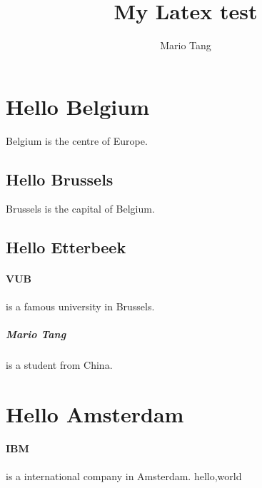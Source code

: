 \documentclass{article}
\title{My Latex test}
\author{Mario Tang}
\begin{document}
\maketitle
\section{Hello Belgium} Belgium is the centre of Europe.
\subsection{Hello Brussels} Brussels is the capital of Belgium.
\subsection{Hello Etterbeek}
\paragraph{VUB} is a famous university in Brussels.
\subparagraph{Mario Tang} is a student from China.
\section{Hello Amsterdam}
\paragraph{IBM} is a international company in Amsterdam.
hello,world %
\end{document}

